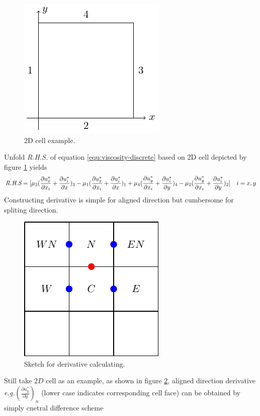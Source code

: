 \begin{figure}[H]
    \centering
    \includegraphics{./image/viscosity-h/2Dexample}
    \caption{2D cell example.}
    \label{fig:viscosity-2Dexample}
\end{figure}
Unfold \emph{R.H.S.} of equation \ref{equ:viscosity-discrete} based on 2D cell depicted by figure \ref{fig:viscosity-2Dexample} yields
\begin{equation}\label{equ:viscosity-2dunfold}
    \emph{R.H.S} = [\mu_3(\frac{\partial u^*_x}{\partial x_i}+\frac{\partial u^*_i}{\partial x})_3 - \mu_1(\frac{\partial u^*_x}{\partial x_i}+\frac{\partial u^*_i}{\partial x})_1+\mu_4(\frac{\partial u^*_y}{\partial x_i}+\frac{\partial u^*_i}{\partial y})_4-\mu_2(\frac{\partial u^*_y}{\partial x_i}+\frac{\partial u^*_i}{\partial y})_2]\quad i = x,y
\end{equation}
 Constructing derivative is simple for aligned direction but cumbersome for spliting direction.
\begin{figure}[H]
    \centering
    \includegraphics{./image/viscosity-h/2Dcelld}
    \caption{Sketch for derivative calculating.}
    \label{fig:viscosity-2Dcelld}
\end{figure}
Still take $2D$ cell as an example, as shown in figure \ref{fig:viscosity-2Dcelld}, aligned direction derivative \emph{e.g.}$(\frac{\partial u^*_y}{\partial y})_n$ (lower case indicates corresponding cell face) can be obtained by simply cnetral difference scheme
